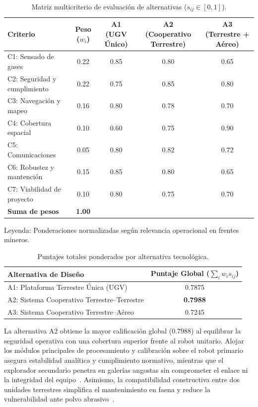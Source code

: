 \begin{table}[H]
\centering
\caption{Matriz multicriterio de evaluación de alternativas ($s_{ij} \in [0, 1]$).}
\label{tab:matriz_compacta}
\small
\renewcommand{\arraystretch}{1.15}
\begin{tabular}{@{}lcccc@{}}
\toprule
Criterio & Peso ($w_i$) & A1 (UGV Único) & A2 (Cooperativo Terrestre) & A3 (Terrestre + Aéreo) \\
\midrule
C1: Sensado de gases        & 0.22 & 0.85 & 0.80 & 0.65 \\
C2: Seguridad y cumplimiento & 0.22 & 0.75 & 0.85 & 0.80 \\
C3: Navegación y mapeo      & 0.16 & 0.80 & 0.78 & 0.70 \\
C4: Cobertura espacial      & 0.10 & 0.60 & 0.75 & 0.90 \\
C5: Comunicaciones          & 0.05 & 0.80 & 0.82 & 0.72 \\
C6: Robustez y mantención   & 0.15 & 0.85 & 0.80 & 0.65 \\
C7: Viabilidad de proyecto  & 0.10 & 0.80 & 0.75 & 0.70 \\
\midrule
\textbf{Suma de pesos}      & \textbf{1.00} & & & \\
\bottomrule
\end{tabular}

\vspace{0.4em}
\footnotesize
Leyenda: Ponderaciones normalizadas según relevancia operacional en frentes mineros.
\end{table}

\begin{table}[H]
\centering
\caption{Puntajes totales ponderados por alternativa tecnológica.}
\label{tab:totales_compacto}
\small
\renewcommand{\arraystretch}{1.15}
\begin{tabular}{@{}lc@{}}
\toprule
Alternativa de Diseño & Puntaje Global ($\sum_i w_i s_{ij}$) \\
\midrule
A1: Plataforma Terrestre Única (UGV)               & 0.7875 \\
A2: Sistema Cooperativo Terrestre--Terrestre        & \textbf{0.7988} \\
A3: Sistema Cooperativo Terrestre--Aéreo            & 0.7245 \\
\bottomrule
\end{tabular}
\end{table}

La alternativa A2 obtiene la mayor calificación global (0.7988) al equilibrar la seguridad operativa con una cobertura superior frente al robot unitario. Alojar los módulos principales de procesamiento y calibración sobre el robot primario asegura estabilidad analítica y cumplimiento normativo, mientras que el explorador secundario penetra en galerías angostas sin comprometer el enlace ni la integridad del equipo~\cite{MINEM_DS024_2016, OSINERGMIN_BoletinGSM_Ventilacion_2020, EU_ExposureDirective_2020}. Asimismo, la compatibilidad constructiva entre dos unidades terrestres simplifica el mantenimiento en faena y reduce la vulnerabilidad ante polvo abrasivo~\cite{AdvancesMining_2023}.

